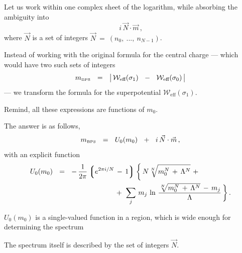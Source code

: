 \documentclass[12pt,letterpaper,landscape,KOMA,smallheadings,calcdimensions,display]{powersem}
\newcommand{\mbps}{m_{\text{\tiny BPS}}}
\newcommand{\W}{\mathcal{W}}
\begin{document}
\begin{slide}
\vspace*{0.7cm}

	Let us work within one complex sheet of the logarithm, while absorbing the ambiguity into
\[
	i\, \vec{N} \cdot \vec{m}\,\text{,}
\]
	where $ \vec{N} $ is a set of integers $\vec{N} ~=~ (n_0,~ ...,~ n_{N-1}) $.
	
	Instead of working with the original formula for the central charge --- which would
	have two such sets of integers 
\[
\mbps ~~=~~ \big|\, \W_\text{eff} ( \sigma_1 ) ~~-~~ \W_\text{eff} ( \sigma_0 ) \,\big|
\]
	--- we transform the formula for the superpotential $ \W_\text{eff}(\sigma_1) $.

	Remind, all these expressions are functions of $ m_0 $.

\end{slide}


\begin{slide}
\vspace*{0.2cm}

	The answer is as follows,
\[
	\mbps ~~=~~ U_0 (m_0) ~~+~~ i\, \vec{N} \cdot \vec{m}\,,
\]
	with an explicit function
\begin{align*}
%
\label{unod}
	U_0 (m_0) & ~~=~~ -\, \frac{1}{2\pi} \lgr e^{2\pi i / N} \,-\, 1 \rgr 
	\biggl\{\, N \sqrt[N] { m_0^N \,+\, \Lambda^N }  ~+~ 
	\\
%
	&
	\hspace*{3cm}
	~+~
	\sum_j\, m_j\, \ln \, \frac{ \sqrt[N] { m_0^N \,+\, \Lambda^N } \,-\, m_j } { \Lambda} \,\biggr\}\,.
\end{align*}

	$ U_0(m_0) $ is a single-valued function in a region, which is wide enough
	for determining the spectrum

	The spectrum itself is described by the set of integers $ \vec{N} $.

\end{slide}
\end{document}
